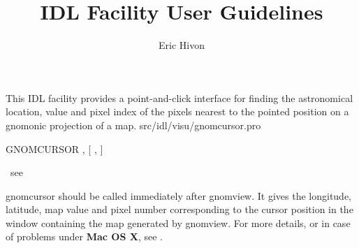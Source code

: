 




\sloppy



\title{\healpix IDL Facility User Guidelines}
 \section[gnomcursor]{ }
\label{idl:\thedocid}
\author{Eric Hivon}


\begin{facility}
{This IDL facility provides a point-and-click interface for finding
the astronomical location, value and pixel index of the pixels nearest 
to the pointed position on a gnomonic projection of a \healpix map.}
{src/idl/visu/gnomcursor.pro}
\end{facility}

\begin{IDLformat}
{{GNOMCURSOR}%
, [%
, %
]}
\end{IDLformat}

\begin{qualifiers}
\hbox{\hspace{5cm}		see }
\end{qualifiers}


\begin{codedescription}
{gnomcursor should be called immediately after gnomview. It gives the longitude,
latitude, map value and pixel number
corresponding to the cursor position in the window containing the map generated
by gnomview. For more details, or in case
of problems under {\bf Mac OS X}, see .}
\end{codedescription}




